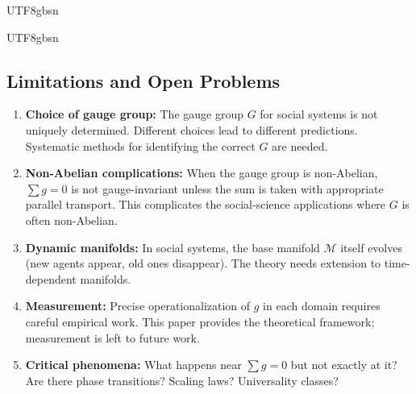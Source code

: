\documentclass[11pt,a4paper]{article}
\newcommand{\Manifold}{\mathcal{M}}
\begin{document}
\begin{CJK}{UTF8}{gbsn}
{\begin{CJK}{UTF8}{gbsn}
\subsection{Limitations and Open Problems}
\begin{enumerate}[label=(\arabic*)]
    \item \textbf{Choice of gauge group:} The gauge group $G$ for social systems
          is not uniquely determined. Different choices lead to different
          predictions. Systematic methods for identifying the correct $G$ are needed.
    \item \textbf{Non-Abelian complications:} When the gauge group is non-Abelian,
          $\sum g = 0$ is not gauge-invariant unless the sum is taken with
          appropriate parallel transport. This complicates the social-science
          applications where $G$ is often non-Abelian.
    \item \textbf{Dynamic manifolds:} In social systems, the base manifold $\Manifold$
          itself evolves (new agents appear, old ones disappear). The theory
          needs extension to time-dependent manifolds.
    \item \textbf{Measurement:} Precise operationalization of $g$ in each domain
          requires careful empirical work. This paper provides the theoretical
          framework; measurement is left to future work.
    \item \textbf{Critical phenomena:} What happens near $\sum g = 0$ but not exactly
          at it? Are there phase transitions? Scaling laws? Universality classes?
\end{enumerate}
\end{CJK}
}
\end{CJK}
\end{document}
